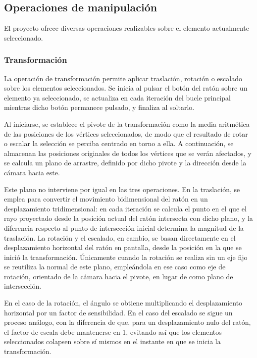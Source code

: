 \subsection{Operaciones de manipulación}

El proyecto ofrece diversas operaciones realizables sobre el elemento actualmente seleccionado.

\subsubsection{Transformación}

La operación de transformación permite aplicar traslación, rotación o escalado sobre los elementos seleccionados. Se inicia al pulsar el botón del ratón sobre un elemento ya seleccionado, se actualiza en cada iteración del bucle principal mientras dicho botón permanece pulsado, y finaliza al soltarlo.

Al iniciarse, se establece el pivote de la transformación como la media aritmética de las posiciones de los vértices seleccionados, de modo que el resultado de rotar o escalar la selección se perciba centrado en torno a ella. A continuación, se almacenan las posiciones originales de todos los vértices que se verán afectados, y se calcula un plano de arrastre, definido por dicho pivote y la dirección desde la cámara hacia este.

Este plano no interviene por igual en las tres operaciones. En la traslación, se emplea para convertir el movimiento bidimensional del ratón en un desplazamiento tridimensional: en cada iteración se calcula el punto en el que el rayo proyectado desde la posición actual del ratón intersecta con dicho plano, y la diferencia respecto al punto de intersección inicial determina la magnitud de la traslación. La rotación y el escalado, en cambio, se basan directamente en el desplazamiento horizontal del ratón en pantalla, desde la posición en la que se inició la transformación. Únicamente cuando la rotación se realiza sin un eje fijo se reutiliza la normal de este plano, empleándola en ese caso como eje de rotación, orientado de la cámara hacia el pivote, en lugar de como plano de intersección.

En el caso de la rotación, el ángulo se obtiene multiplicando el desplazamiento horizontal por un factor de sensibilidad. En el caso del escalado se sigue un proceso análogo, con la diferencia de que, para un desplazamiento nulo del ratón, el factor de escala debe mantenerse en 1, evitando así que los elementos seleccionados colapsen sobre sí mismos en el instante en que se inicia la transformación.

